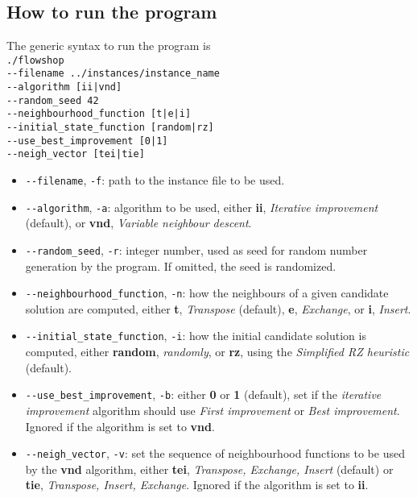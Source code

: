 \documentclass[
12pt,
a4paper,
oneside,
headinclude,
footinclude]{article}
\theoremstyle{definition} %
\begin{document}
\newpage
\subsection{\textbf{How to run the program}}
The generic syntax to run the program is\\
\-\quad\texttt{./flowshop} \\
\-\quad\quad\texttt{-{}-filename ../instances/instance\_name} \\
\-\quad\quad\texttt{-{}-algorithm [ii|vnd]} \\
\-\quad\quad\texttt{-{}-random\_seed 42} \\
\-\quad\quad\texttt{-{}-neighbourhood\_function [t|e|i]} \\
\-\quad\quad\texttt{-{}-initial\_state\_function [random|rz]} \\
\-\quad\quad\texttt{-{}-use\_best\_improvement [0|1]} \\
\-\quad\quad\texttt{-{}-neigh\_vector [tei|tie]} \\


\begin{itemize}
    \item \texttt{-{}-filename}, \texttt{-f}: path to the instance file to be used.
    \item \texttt{-{}-algorithm}, \texttt{-a}: algorithm to be used, either \textbf{ii}, \textit{Iterative improvement} (default), or \textbf{vnd}, \textit{Variable neighbour descent}.
    \item \texttt{-{}-random\_seed}, \texttt{-r}: integer number, used as seed for random number generation by the program. If omitted, the seed is randomized.
    \item \texttt{-{}-neighbourhood\_function}, \texttt{-n}: how the neighbours of a given candidate solution are computed, either \textbf{t}, \textit{Transpose} (default), \textbf{e}, \textit{Exchange}, or \textbf{i}, \textit{Insert}.
    \item \texttt{-{}-initial\_state\_function}, \texttt{-i}: how the initial candidate solution is computed, either \textbf{random}, \textit{randomly}, or \textbf{rz}, using the \textit{Simplified RZ heuristic} (default).
    \item \texttt{-{}-use\_best\_improvement}, \texttt{-b}: either \textbf{0} or \textbf{1} (default), set if the \textit{iterative improvement} algorithm should use \textit{First improvement} or \textit{Best improvement}. Ignored if the algorithm is set to \textbf{vnd}.
    \item \texttt{-{}-neigh\_vector}, \texttt{-v}: set the sequence of neighbourhood functions to be used by the \textbf{vnd} algorithm, either \textbf{tei}, \textit{Transpose, Exchange, Insert} (default) or \textbf{tie}, \textit{Transpose, Insert, Exchange}. Ignored if the algorithm is set to \textbf{ii}.
\end{itemize}
\end{document}
